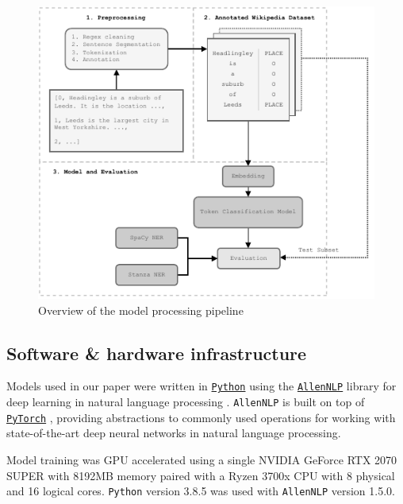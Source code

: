 \documentclass[]{interact}
\theoremstyle{plain}%
\theoremstyle{definition}
\theoremstyle{remark}
\begin{document}
\begin{figure}[tb]

{\centering \includegraphics[width=\linewidth]{figures/figure1_template} 

}

\caption{Overview of the model processing pipeline}\label{fig:workflow}
\end{figure}

\hypertarget{software-hardware-infrastructure}{%
\subsection{Software \& hardware
infrastructure}\label{software-hardware-infrastructure}}

Models used in our paper were written in
\href{https://www.python.org/}{\texttt{Python}} using the
\href{https://allennlp.org/}{\texttt{AllenNLP}} library for deep
learning in natural language processing \citep{gardner2018}.
\texttt{AllenNLP} is built on top of
\href{https://pytorch.org}{\texttt{PyTorch}} \citep{paszke2019},
providing abstractions to commonly used operations for working with
state-of-the-art deep neural networks in natural language processing.

Model training was GPU accelerated using a single NVIDIA GeForce RTX
2070 SUPER with 8192MB memory paired with a Ryzen 3700x CPU with 8
physical and 16 logical cores. \texttt{Python} version 3.8.5 was used
with \texttt{AllenNLP} version 1.5.0.
\end{document}
